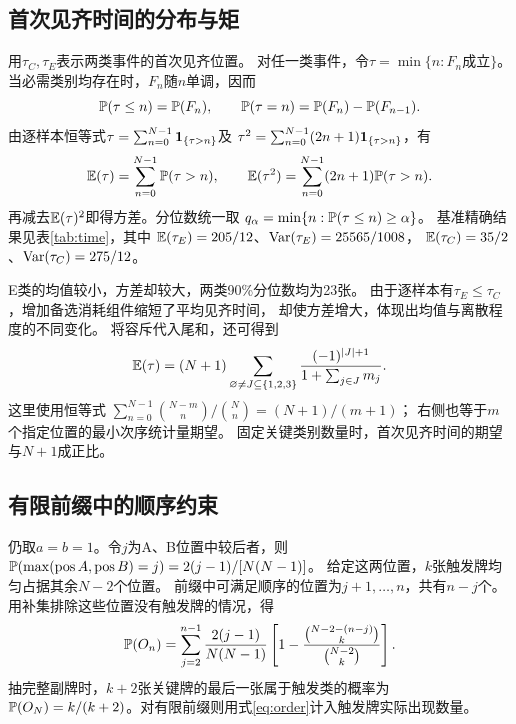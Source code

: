 \subsection{首次见齐时间的分布与矩}
用$\tau_C,\tau_E$表示两类事件的首次见齐位置。
对任一类事件，令$\tau=\min\{n:F_n\text{成立}\}$。
当必需类别均存在时，$F_n$随$n$单调，因而
\begin{equation}\label{eq:time-pmf}
\mathbb P(\tau\le n)=\mathbb P(F_n),\qquad
\mathbb P(\tau=n)=\mathbb P(F_n)-\mathbb P(F_{n-1}).
\end{equation}
由逐样本恒等式$\tau=\sum_{n=0}^{N-1}\mathbf 1_{\{\tau>n\}}$及
$\tau^2=\sum_{n=0}^{N-1}(2n+1)\mathbf 1_{\{\tau>n\}}$，有
\begin{equation}\label{eq:tail-moments}
\mathbb E(\tau)=\sum_{n=0}^{N-1}\mathbb P(\tau>n),\qquad
\mathbb E(\tau^2)=\sum_{n=0}^{N-1}(2n+1)\mathbb P(\tau>n).
\end{equation}
再减去$\mathbb E(\tau)^2$即得方差。分位数统一取
$q_\alpha=\min\{n:\mathbb P(\tau\le n)\ge\alpha\}$。
基准精确结果见表\ref{tab:time}，其中
$\mathbb E(\tau_E)=205/12$、$\operatorname{Var}(\tau_E)=25565/1008$，
$\mathbb E(\tau_C)=35/2$、$\operatorname{Var}(\tau_C)=275/12$。

\begin{table}[htbp]
\centering\small
\caption{基准首次见齐时间的精确理论指标}\label{tab:time}

\end{table}

E类的均值较小，方差却较大，两类90\%分位数均为23张。
由于逐样本有$\tau_E\le\tau_C$，增加备选消耗组件缩短了平均见齐时间，
却使方差增大，体现出均值与离散程度的不同变化。
将容斥代入尾和，还可得到
\begin{equation}\label{eq:time-general-mean}
\mathbb E(\tau)=(N+1)
\sum_{\varnothing\ne J\subseteq\{1,2,3\}}
\frac{(-1)^{|J|+1}}{1+\sum_{j\in J}m_j}.
\end{equation}
这里使用恒等式
$\sum_{n=0}^{N-1}\binom{N-m}{n}/\binom Nn=(N+1)/(m+1)$；
右侧也等于$m$个指定位置的最小次序统计量期望。
固定关键类别数量时，首次见齐时间的期望与$N+1$成正比。

\subsection{有限前缀中的顺序约束}
仍取$a=b=1$。令$j$为A、B位置中较后者，则
$\mathbb P(\max(\operatorname{pos}A,\operatorname{pos}B)=j)
={2(j-1)}/{[N(N-1)]}$。
给定这两位置，$k$张触发牌均匀占据其余$N-2$个位置。
前缀中可满足顺序的位置为$j+1,\ldots,n$，共有$n-j$个。
用补集排除这些位置没有触发牌的情况，得
\begin{equation}\label{eq:order}
\mathbb P(O_n)=\sum_{j=2}^{n-1}\frac{2(j-1)}{N(N-1)}
\left[1-\frac{\binom{N-2-(n-j)}{k}}{\binom{N-2}{k}}\right].
\end{equation}
抽完整副牌时，$k+2$张关键牌的最后一张属于触发类的概率为
$\mathbb P(O_N)=k/(k+2)$。对有限前缀则用式\eqref{eq:order}计入触发牌实际出现数量。


